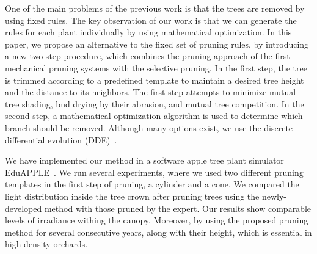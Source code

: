 One of the main problems of the previous work is that the trees are
removed by using fixed rules. The key observation of our work is
that we can generate the rules for each plant individually by using mathematical optimization.
In this paper, we propose an alternative
to the fixed set of pruning rules, by introducing a new two-step
procedure, which combines the pruning approach of the first mechanical
pruning systems with the selective pruning. In the first step, the tree
is trimmed according to a predefined template to maintain a desired
tree height and the distance to its neighbors. The first step attempts to minimize mutual tree shading, bud drying by their abrasion, and mutual tree competition.
In the second step, a mathematical optimization algorithm is used to determine which branch should be removed. Although many options exist, we use 
the discrete differential evolution (DDE)~\cite{strnad_novel_2017}. 

We have implemented our method in a software apple tree plant simulator EduAPPLE~\cite{kohek_eduapple:_2015}. We run several experiments,
where we used two different pruning templates in the first
step of pruning, a cylinder and a cone. 
We compared the light distribution inside the tree crown after pruning trees using the
newly-developed method with those pruned by the expert.
Our results show comparable levels of irradiance withing the canopy.
Moreover, by using the proposed pruning method for several consecutive
years,  along
with their height, which is essential in high-density orchards.

